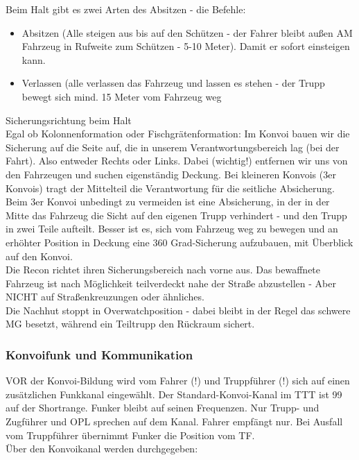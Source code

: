 Beim Halt gibt es zwei Arten des Absitzen - die Befehle:

	\begin{itemize}
		\item Absitzen (Alle steigen aus bis auf den Schützen - der Fahrer bleibt außen AM Fahrzeug in Rufweite zum Schützen - 5-10 Meter). Damit er sofort einsteigen kann.
		\item Verlassen (alle verlassen das Fahrzeug und lassen es stehen - der Trupp bewegt sich mind. 15 Meter vom Fahrzeug weg
	\end{itemize}

	Sicherungsrichtung beim Halt \\
Egal ob Kolonnenformation oder Fischgrätenformation: Im Konvoi bauen wir die Sicherung auf die Seite auf, die in unserem Verantwortungsbereich lag (bei der Fahrt). Also entweder Rechts oder Links. Dabei (wichtig!) entfernen wir uns von den Fahrzeugen und suchen eigenständig Deckung. Bei kleineren Konvois (3er Konvois) tragt der Mittelteil die Verantwortung für die seitliche Absicherung. Beim 3er Konvoi unbedingt zu vermeiden ist eine Absicherung, in der in der Mitte das Fahrzeug die Sicht auf den eigenen Trupp verhindert - und den Trupp in zwei Teile aufteilt. Besser ist es, sich vom Fahrzeug weg zu bewegen und an erhöhter Position in Deckung eine 360 Grad-Sicherung aufzubauen, mit Überblick auf den Konvoi. \\
	Die Recon richtet ihren Sicherungsbereich nach vorne aus. Das bewaffnete Fahrzeug ist nach Möglichkeit teilverdeckt nahe der Straße abzustellen - Aber NICHT auf Straßenkreuzungen oder ähnliches. \\
	Die Nachhut stoppt in Overwatchposition - dabei bleibt in der Regel das schwere MG besetzt, während ein Teiltrupp den Rückraum sichert. \\

\subsubsection{Konvoifunk und Kommunikation}
	VOR der Konvoi-Bildung wird vom Fahrer (!) und Truppführer (!) sich auf einen zusätzlichen Funkkanal eingewählt. Der Standard-Konvoi-Kanal im TTT ist 99 auf der Shortrange. Funker bleibt auf seinen Frequenzen. Nur Trupp- und Zugführer und OPL sprechen auf dem Kanal. Fahrer empfängt nur. Bei Ausfall vom Truppführer übernimmt Funker die Position vom TF. \\
	Über den Konvoikanal werden durchgegeben:

